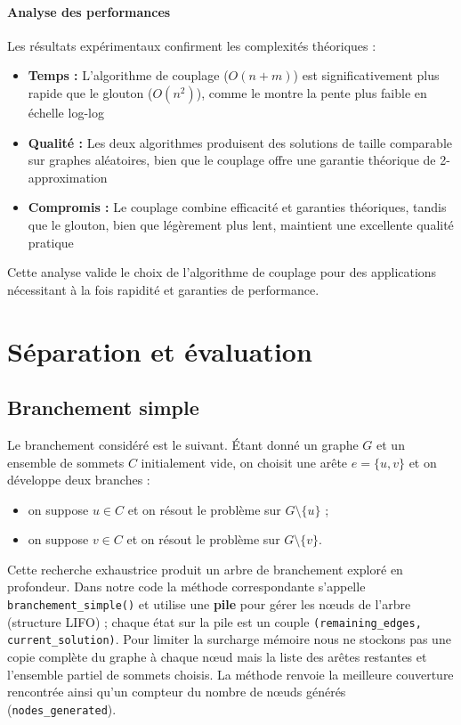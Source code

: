 \documentclass[11pt,a4paper]{article}
\begin{document}
\paragraph{Analyse des performances}
Les résultats expérimentaux confirment les complexités théoriques :
\begin{itemize}
    \item \textbf{Temps :} L'algorithme de couplage ($O(n+m)$) est significativement plus rapide que le glouton ($O(n^2)$), comme le montre la pente plus faible en échelle log-log
    \item \textbf{Qualité :} Les deux algorithmes produisent des solutions de taille comparable sur graphes aléatoires, bien que le couplage offre une garantie théorique de 2-approximation
    \item \textbf{Compromis :} Le couplage combine efficacité et garanties théoriques, tandis que le glouton, bien que légèrement plus lent, maintient une excellente qualité pratique
\end{itemize}

Cette analyse valide le choix de l'algorithme de couplage pour des applications nécessitant à la fois rapidité et garanties de performance.

\section{S\'eparation et \'evaluation}

\subsection{Branchement simple}

Le branchement consid\'er\'e est le suivant. \'Etant donn\'e un graphe $G$ et un ensemble
de sommets $C$ initialement vide, on choisit une ar\^ete $e=\{u,v\}$ et on d\'eveloppe deux
branches :
\begin{itemize}
  \item on suppose $u\in C$ et on r\'esout le probl\`eme sur $G\setminus\{u\}$ ;
  \item on suppose $v\in C$ et on r\'esout le probl\`eme sur $G\setminus\{v\}$.
\end{itemize}

Cette recherche exhaustrice produit un arbre de branchement explor\'e en profondeur.  
Dans notre code la m\'ethode correspondante s'appelle \texttt{branchement\_simple()} et utilise
une \textbf{pile} pour g\'erer les nœuds de l’arbre (structure LIFO) ; chaque \'etat sur la
pile est un couple \texttt{(remaining\_edges, current\_solution)}. Pour limiter la surcharge
m\'emoire nous ne stockons pas une copie compl\`ete du graphe \`a chaque nœud mais la liste
des ar\^etes restantes et l’ensemble partiel de sommets choisis. La m\'ethode renvoie la
meilleure couverture rencontr\'ee ainsi qu’un compteur du nombre de nœuds g\'en\'er\'es
(\texttt{nodes\_generated}).
\end{document}
